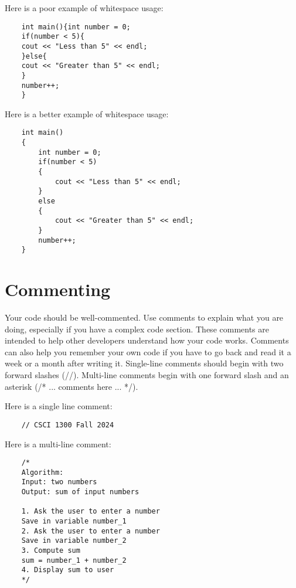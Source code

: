 \begin{example}
    Here is a poor example of whitespace usage:
    \begin{verbatim}
    int main(){int number = 0;
    if(number < 5){
    cout << "Less than 5" << endl;
    }else{
    cout << "Greater than 5" << endl;
    }
    number++;
    }
    \end{verbatim}
    Here is a better example of whitespace usage:
    \begin{verbatim}
    int main()
    {
        int number = 0;
        if(number < 5)
        {
            cout << "Less than 5" << endl;
        }
        else
        {
            cout << "Greater than 5" << endl;
        }
        number++;
    }
    \end{verbatim}
\end{example}


\section{Commenting}
Your code should be well-commented. Use comments to explain what you are doing, especially if you have a complex code section. These comments are intended to help other developers understand how your code works. Comments can also help you remember your own code if you have to go back and read it a week or a month after writing it. Single-line comments should begin with two forward slashes (//). Multi-line comments begin with one forward slash and an asterisk (/* ... comments here ... */).

\begin{example}
    Here is a single line comment:
\begin{verbatim}
    // CSCI 1300 Fall 2024
\end{verbatim}
    Here is a multi-line comment:
    \begin{verbatim}
    /*
    Algorithm:
    Input: two numbers
    Output: sum of input numbers
    
    1. Ask the user to enter a number
    Save in variable number_1
    2. Ask the user to enter a number
    Save in variable number_2
    3. Compute sum
    sum = number_1 + number_2
    4. Display sum to user
    */
    \end{verbatim}
\end{example}